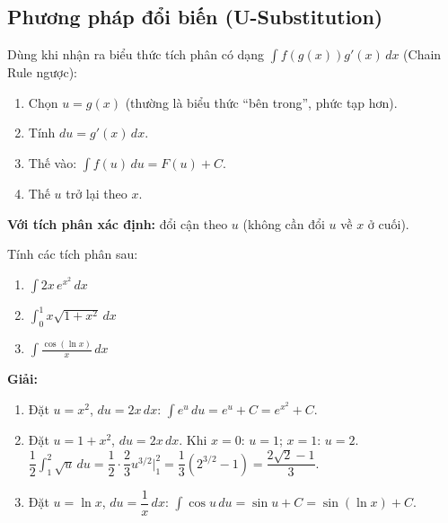 \documentclass[12pt,a4paper]{article}
\begin{document}
\subsection{Phương pháp đổi biến (U-Substitution)}

\begin{phuongphap}[title={U-Substitution}]
  Dùng khi nhận ra biểu thức tích phân có dạng $\displaystyle\int f(g(x)) g'(x)\,dx$ (Chain Rule ngược):
  \begin{enumerate}
    \item Chọn $u = g(x)$ (thường là biểu thức ``bên trong'', phức tạp hơn).
    \item Tính $du = g'(x)\,dx$.
    \item Thế vào: $\displaystyle\int f(u)\,du = F(u) + C$.
    \item Thế $u$ trở lại theo $x$.
  \end{enumerate}
  \textbf{Với tích phân xác định:} đổi cận theo $u$ (không cần đổi $u$ về $x$ ở cuối).
\end{phuongphap}

\begin{vidu}
  Tính các tích phân sau:
  \begin{enumerate}[label=(\alph*)]
    \item $\displaystyle\int 2x\,e^{x^2}\,dx$
    \item $\displaystyle\int_0^1 x\sqrt{1+x^2}\,dx$
    \item $\displaystyle\int \frac{\cos(\ln x)}{x}\,dx$
  \end{enumerate}

  \medskip\textbf{Giải:}
  \begin{enumerate}[label=(\alph*)]
    \item Đặt $u = x^2$, $du = 2x\,dx$:
      $\displaystyle\int e^u\,du = e^u + C = e^{x^2} + C$.
    \item Đặt $u = 1+x^2$, $du = 2x\,dx$. Khi $x=0$: $u=1$; $x=1$: $u=2$.
      $\dfrac{1}{2}\displaystyle\int_1^2 \sqrt{u}\,du = \dfrac{1}{2}\cdot\dfrac{2}{3}u^{3/2}\Big|_1^2 = \dfrac{1}{3}(2^{3/2} - 1) = \dfrac{2\sqrt{2}-1}{3}$.
    \item Đặt $u = \ln x$, $du = \dfrac{1}{x}\,dx$:
      $\displaystyle\int \cos u\,du = \sin u + C = \sin(\ln x) + C$.
  \end{enumerate}
\end{vidu}
\end{document}
